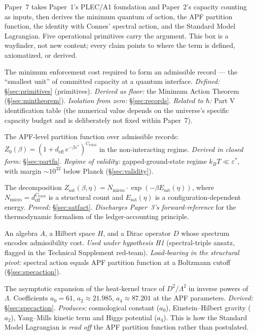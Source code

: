 \documentclass[11pt]{article}
\theoremstyle{definition}
\begin{document}
\begin{tcolorbox}[apfbox, title={Operational primitives: where each term is defined and used}]
Paper~7 takes Paper~1's PLEC/A1 foundation and Paper~2's capacity counting as inputs, then derives the minimum quantum of action, the APF partition function, the identity with Connes' spectral action, and the Standard Model Lagrangian.  Five operational primitives carry the argument.  This box is a wayfinder, not new content; every claim points to where the term is defined, axiomatized, or derived.

\begin{description}[topsep=2pt,itemsep=2pt]
  \item[Quantum of action $\varepsilon^*$.]  The minimum enforcement cost required to form an admissible record --- the ``smallest unit'' of committed capacity at a quantum interface.  \emph{Defined:} \S\ref{sec:primitives} (primitives).  \emph{Derived as floor:} the Minimum Action Theorem (\S\ref{sec:mintheorem}).  \emph{Isolation from zero:} \S\ref{sec:records}.  \emph{Related to $\hbar$:} Part V identification table (the numerical value depends on the universe's specific capacity budget and is deliberately not fixed within Paper~7).
  \item[Partition function $Z(\beta)$.]  The APF-level partition function over admissible records: $Z_0(\beta) = (1 + d_{\mathrm{eff}}\,e^{-\beta\varepsilon^*})^{C_{\mathrm{total}}}$ in the non-interacting regime.  \emph{Derived in closed form:} \S\ref{sec:partfn}.  \emph{Regime of validity:} gapped-ground-state regime $k_B T \ll \varepsilon^*$, with margin $\sim 10^{32}$ below Planck (\S\ref{sec:validity}).
  \item[Saturation factorisation.]  The decomposition $Z_{\mathrm{sat}}(\beta, \eta) = N_{\mathrm{micro}}\cdot\exp(-\beta E_{\mathrm{sat}}(\eta))$, where $N_{\mathrm{micro}} = d_{\mathrm{eff}}^{C_{\mathrm{total}}}$ is a structural count and $E_{\mathrm{sat}}(\eta)$ is a configuration-dependent energy.  \emph{Proved:} \S\ref{sec:satfact}.  \emph{Discharges Paper~3's forward-reference} for the thermodynamic formalism of the ledger-accounting principle.
  \item[Spectral triple $(A, H, D)$.]  An algebra $A$, a Hilbert space $H$, and a Dirac operator $D$ whose spectrum encodes admissibility cost.  \emph{Used under hypothesis H1} (spectral-triple ansatz, flagged in the Technical Supplement red-team).  \emph{Load-bearing in the structural pivot:} spectral action equals APF partition function at a Boltzmann cutoff (\S\ref{sec:specaction}).
  \item[Seeley--DeWitt expansion.]  The asymptotic expansion of the heat-kernel trace of $D^2/\Lambda^2$ in inverse powers of $\Lambda$.  Coefficients $a_0 = 61$, $a_2 \approx 21.985$, $a_4 \approx 87.201$ at the APF parameters.  \emph{Derived:} \S\ref{sec:specaction}.  \emph{Produces:} cosmological constant ($a_0$), Einstein--Hilbert gravity ($a_2$), Yang--Mills kinetic term and Higgs potential ($a_4$).  This is how the Standard Model Lagrangian is \emph{read off} the APF partition function rather than postulated.
\end{description}


\end{tcolorbox}
\end{document}
